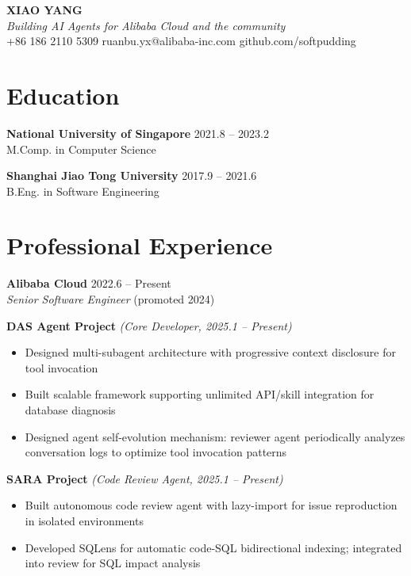 \documentclass[11pt,a4paper]{article}
\begin{document}
\begin{center}
    {\LARGE\bfseries XIAO YANG}\\[2pt]
    \textit{Building AI Agents for Alibaba Cloud and the community}\\[2pt]
    +86 186 2110 5309 \textbullet{} ruanbu.yx@alibaba-inc.com \textbullet{} github.com/softpudding
\end{center}

\vspace{2pt}

\section{Education}
\vspace{2pt}
\noindent\textbf{National University of Singapore} \hfill 2021.8 -- 2023.2\\
\quad M.Comp. in Computer Science

\noindent\textbf{Shanghai Jiao Tong University} \hfill 2017.9 -- 2021.6\\
\quad B.Eng. in Software Engineering

\vspace{6pt}

\section{Professional Experience}
\noindent\textbf{Alibaba Cloud} \hfill 2022.6 -- Present\\
\quad \textit{Senior Software Engineer} (promoted 2024)

\vspace{4pt}

\noindent\textbf{DAS Agent Project} \textit{(Core Developer, 2025.1 -- Present)}
\begin{itemize}
    \item Designed multi-subagent architecture with progressive context disclosure for tool invocation
    \item Built scalable framework supporting unlimited API/skill integration for database diagnosis
    \item Designed agent self-evolution mechanism: reviewer agent periodically analyzes conversation logs to optimize tool invocation patterns
\end{itemize}

\vspace{4pt}
\noindent\textbf{SARA Project} \textit{(Code Review Agent, 2025.1 -- Present)}
\begin{itemize}
    \item Built autonomous code review agent with lazy-import for issue reproduction in isolated environments
    \item Developed SQLens for automatic code-SQL bidirectional indexing; integrated into review for SQL impact analysis
\end{itemize}
\end{document}
